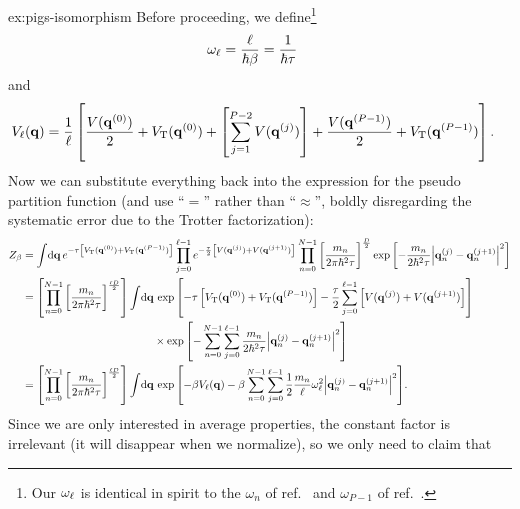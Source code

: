 \begin{DefAnswer}{ex:pigs-isomorphism}
	Before proceeding, we define\footnote{
	Our $\omega_\ell$ is identical in spirit to the $\omega_n$ of ref.~\cite{ceriotti2010efficient} and $\omega_{P-1}$ of ref.~\cite{constable2013langevin}.
	}
	\begin{align}
		\omega_\ell
		&= \frac{\ell}{\hbar \beta}
		= \frac{1}{\hbar \tau}
			\label{eq:omega-links}
	\end{align}
	and
	\begin{align}
		V_\ell(\bm{\mathbf{q}})
		&= \frac{1}{\ell} \left[
				\frac{V(\bm{\mathbf{q}}^{(0)})}{2}
				+ V_\mathrm{T}(\bm{\mathbf{q}}^{(0)})
				+ \left[ \sum_{j=1}^{P-2} V(\bm{\mathbf{q}}^{(j)}) \right]
				+ \frac{V(\bm{\mathbf{q}}^{(P-1)})}{2}
				+ V_\mathrm{T}(\bm{\mathbf{q}}^{(P-1)})
			\right].
	\end{align}
	Now we can substitute everything back into the expression for the pseudo partition function (and use ``$=$'' rather than ``$\approx$'', boldly disregarding the systematic error due to the Trotter factorization):
	\begin{subequations}
	\begin{align}
		Z_\beta
		&= \int\! \dif \vec{q} \,
			e^{-\tau \left[ \VT(\vec{q}\bead{0}) + \VT(\vec{q}\bead{P-1}) \right]}
			\prod_{j=0}^{\links - 1}
				e^{-\frac{\tau}{2} \left[ V(\vec{q}\bead{j}) + V(\vec{q}\bead{j+1}) \right]}
				\prod_{n=0}^{N-1}
					\left[ \frac{m_n}{2 \pi \hbar^2 \tau} \right]^\frac{D}{2}
					\expb{
						-\frac{m_n}{2 \hbar^2 \tau} \abs{\vec{q}_n\bead{j} - \vec{q}_n\bead{j+1}}^2
					} \\
		&= \left[ \prod_{n=0}^{N-1} \left[ \frac{m_n}{2 \pi \hbar^2 \tau} \right]^\frac{\links D}{2} \right]
			\int\! \dif \vec{q} \,
				\expb{
					-\tau \left[ \VT(\vec{q}\bead{0}) + \VT(\vec{q}\bead{P-1}) \right]
					- \frac{\tau}{2} \sum_{j=0}^{\links - 1} \left[ V(\vec{q}\bead{j}) + V(\vec{q}\bead{j+1}) \right]
				} \notag \\
		&\qquad\qquad\qquad\qquad\qquad\qquad\times
				\expb{
					-\sum_{n=0}^{N-1} \sum_{j=0}^{\links - 1}
						\frac{m_n}{2 \hbar^2 \tau} \abs{\vec{q}_n\bead{j} - \vec{q}_n\bead{j+1}}^2
				} \\
		&= \left[ \prod_{n=0}^{N-1} \left[ \frac{m_n}{2 \pi \hbar^2 \tau} \right]^\frac{\links D}{2} \right]
			\int\! \dif \vec{q} \,
				\expb{
					-\beta V_\links(\vec{q})
					- \beta \sum_{n=0}^{N-1} \sum_{j=0}^{\links - 1}
						\frac{1}{2} \frac{m_n}{\links} \omega_\links^2 \abs{\vec{q}_n\bead{j} - \vec{q}_n\bead{j+1}}^2
				}.
	\end{align}
\end{subequations}
	Since we are only interested in average properties, the constant factor is irrelevant (it will disappear when we normalize), so we only need to claim that

\end{DefAnswer}

